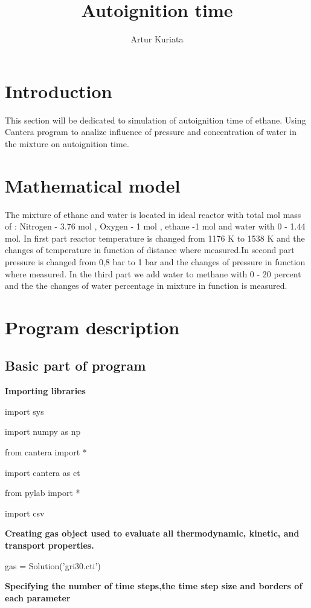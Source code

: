 \documentclass[a4paper]{article}
\title{Autoignition time}
\author{Artur Kuriata}
\begin{document}
\maketitle


\section{Introduction}

This section will be dedicated to simulation of autoignition time of ethane. Using Cantera program to analize influence of pressure and concentration of water in the mixture on autoignition time.

\section{Mathematical model}
The mixture of ethane and water is located in ideal reactor with total mol mass of : Nitrogen - 3.76 mol , Oxygen - 1 mol , ethane -1 mol and water with 0 - 1.44 mol. In first part reactor temperature is changed from 1176 K to 1538 K and the changes of temperature  in function  of distance where measured.In second part pressure is changed from 0,8 bar to 1 bar and the changes of pressure in function where measured. In the third part we add water to methane with 0 - 20 percent and the the changes of water percentage in mixture in function is measured.

\section{Program description}
	\subsection{Basic part of program}
   \textbf{Importing libraries}
   
   import sys
   
import numpy as np

from cantera import *

import cantera as ct

from pylab import *

import csv

\textbf{Creating gas object used to evaluate all thermodynamic, kinetic, and transport
properties.}

gas = Solution('gri30.cti')

\textbf{Specifying the number of time steps,the time step size and borders of each parameter}
\end{document}
